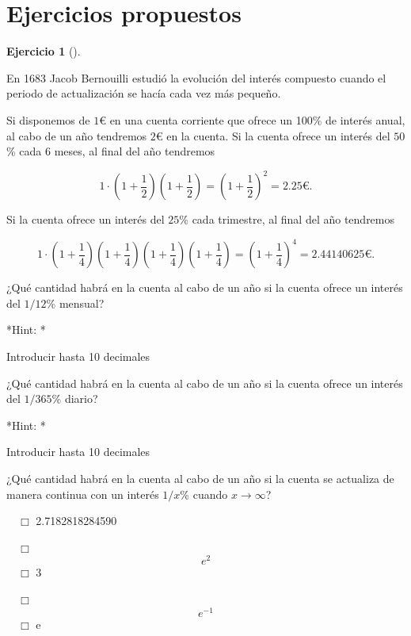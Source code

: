 \documentclass[
  a4paper,
]{scrreport}
\theoremstyle{definition}
\newtheorem{exercise}{Ejercicio}[chapter]
\theoremstyle{remark}
\begin{document}
\section{Ejercicios propuestos}\label{ejercicios-propuestos-2}

\begin{exercise}[]\protect\hypertarget{exr-interes-compuesto}{}\label{exr-interes-compuesto}

En 1683 Jacob Bernouilli estudió la evolución del interés compuesto
cuando el periodo de actualización se hacía cada vez más pequeño.

Si disponemos de \(1\)€ en una cuenta corriente que ofrece un 100\% de
interés anual, al cabo de un año tendremos \(2\)€ en la cuenta. Si la
cuenta ofrece un interés del \(50\)\% cada 6 meses, al final del año
tendremos

\[
1\cdot\left(1+\frac{1}{2}\right)\left(1+\frac{1}{2}\right)= \left(1+\frac{1}{2}\right)^2 = 2.25\mbox{€}.
\]

Si la cuenta ofrece un interés del \(25\)\% cada trimestre, al final del
año tendremos

\[
1\cdot\left(1+\frac{1}{4}\right)\left(1+\frac{1}{4}\right)\left(1+\frac{1}{4}\right)\left(1+\frac{1}{4}\right)= \left(1+\frac{1}{4}\right)^4 = 2.44140625\mbox{€}.
\]

¿Qué cantidad habrá en la cuenta al cabo de un año si la cuenta ofrece
un interés del \(1/12\)\% mensual?

\vspace{18pt}*Hint: *

Introducir hasta 10 decimales

¿Qué cantidad habrá en la cuenta al cabo de un año si la cuenta ofrece
un interés del \(1/365\)\% diario?

\vspace{18pt}*Hint: *

Introducir hasta 10 decimales

¿Qué cantidad habrá en la cuenta al cabo de un año si la cuenta se
actualiza de manera continua con un interés \(1/x\)\% cuando
\(x\to\infty\)?

${\quad\Box}$ 2.7182818284590

${\quad\Box}$ $$e^2$$
${\quad\Box}$ 3

${\quad\Box}$ $$e^{-1}$$
${\quad\Box}$ e

\end{exercise}
\end{document}
